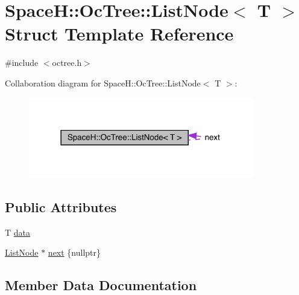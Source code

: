 \hypertarget{struct_space_h_1_1_oc_tree_1_1_list_node}{}\section{SpaceH\+:\+:Oc\+Tree\+:\+:List\+Node$<$ T $>$ Struct Template Reference}
\label{struct_space_h_1_1_oc_tree_1_1_list_node}


{\ttfamily \#include $<$octree.\+h$>$}



Collaboration diagram for SpaceH\+:\+:Oc\+Tree\+:\+:List\+Node$<$ T $>$\+:
\nopagebreak
\begin{figure}[H]
\begin{center}
\leavevmode
\includegraphics[width=278pt]{struct_space_h_1_1_oc_tree_1_1_list_node__coll__graph}
\end{center}
\end{figure}
\subsection*{Public Attributes}
\begin{DoxyCompactItemize}
\item 
T \mbox{\hyperlink{struct_space_h_1_1_oc_tree_1_1_list_node_a42fe42f889392f73e20b7dfda44cdc25}{data}}
\item 
\mbox{\hyperlink{struct_space_h_1_1_oc_tree_1_1_list_node}{List\+Node}} $\ast$ \mbox{\hyperlink{struct_space_h_1_1_oc_tree_1_1_list_node_a6e95458aada7a0faa359bf09f07bf96b}{next}} \{nullptr\}
\end{DoxyCompactItemize}


\subsection{Member Data Documentation}
\mbox{\label{struct_space_h_1_1_oc_tree_1_1_list_node_a42fe42f889392f73e20b7dfda44cdc25}} 
